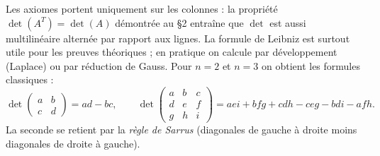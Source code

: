 Les axiomes portent uniquement sur les colonnes : la propriété
$\det(A^T)=\det(A)$ démontrée au §2 entraîne que $\det$ est aussi
multilinéaire alternée par rapport aux lignes.
La formule de Leibniz est surtout utile pour les preuves théoriques ; en pratique on
calcule par développement (Laplace) ou par réduction de Gauss.
Pour $n=2$ et $n=3$ on obtient les formules classiques :
\[
  \det\begin{pmatrix}a&b\\c&d\end{pmatrix} = ad - bc,
  \qquad
  \det\begin{pmatrix}a&b&c\\d&e&f\\g&h&i\end{pmatrix}
  = aei + bfg + cdh - ceg - bdi - afh.
\]
La seconde se retient par la \emph{règle de Sarrus}
(diagonales de gauche à droite moins diagonales de droite à gauche).

\decsep{}


